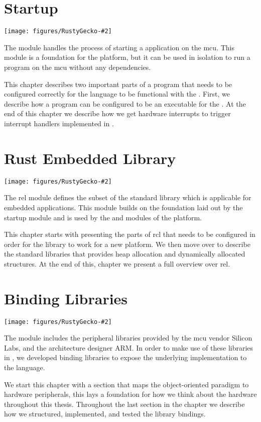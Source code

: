 
\newcommand{\corechapter}[3]{
  \chapter{#1}
  \label{chap:#2}
  \begin{center}
    \texttt{[image: figures/RustyGecko-\#2]}
  \end{center}
  \hfill \break
  \hfill \break
#3
}

\corechapter{Startup}{startup}{%
The  module handles the process of starting a {\rust} application on the \glsdesc{mcu}.
This module is a foundation for the {\rg} platform, but it can be used in isolation to run a program on the \gls{mcu} without any dependencies.

This chapter describes two important parts of a {\rust} program that needs to be configured correctly for the language to be functional with the {\gecko}.
First, we describe how a {\rust} program can be configured to be an executable for the {\gecko}.
At the end of this chapter we describe how we get hardware interrupts to trigger interrupt handlers implemented in {\rust}.
}


\corechapter{Rust Embedded Library}{rel}{%
The \glsdesc{rel} module defines the subset of the standard {\rust} library which is applicable for embedded applications.
This module builds on the foundation laid out by the startup module and is used by the \lib{bindings} and \lib{Application Layer} modules of the {\rg} platform.

This chapter starts with presenting the parts of \gls{rcl} that needs to be configured in order for the library to work for a new platform.
We then move over to describe the standard {\rust} libraries that provides heap allocation and dynamically allocated structures.
At the end of this, chapter we present a full overview over \gls{rel}.
}



\corechapter{Binding Libraries}{bindings}{%
The  module includes the peripheral libraries provided by the \gls{mcu} vendor Silicon Labs, and the architecture designer ARM.
In order to make use of these libraries in {\rust}, we developed binding libraries to expose the underlying {\C} implementation to the {\rust} language.

We start this chapter with a section that maps the object-oriented paradigm to hardware peripherals, this lays a foundation for how we think about the hardware throughout this thesis.
Throughout the last section in the chapter we describe how we structured, implemented, and tested the library bindings.
}




